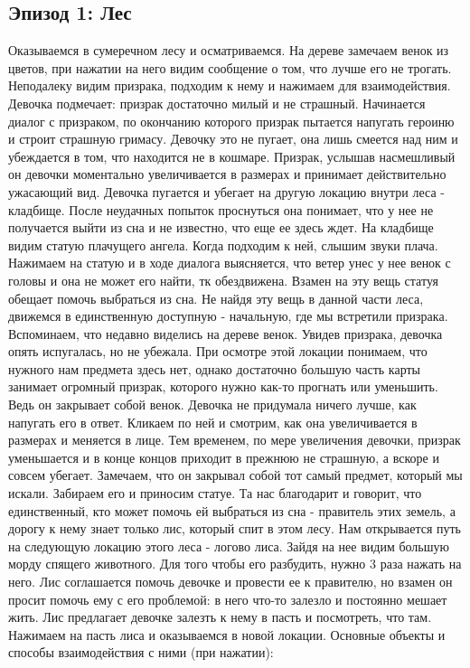 \subsection{Эпизод 1: Лес}

Оказываемся в сумеречном лесу и осматриваемся. На дереве замечаем венок из цветов, при нажатии на него видим сообщение о том, что лучше его не трогать. Неподалеку видим призрака, подходим к нему и нажимаем для взаимодействия. Девочка подмечает: призрак достаточно милый и не страшный. Начинается диалог с призраком, по окончанию которого призрак пытается напугать героиню и строит страшную гримасу. Девочку это не пугает, она лишь смеется над ним и убеждается в том, что находится не в кошмаре. Призрак, услышав насмешливый он девочки моментально увеличивается в размерах и принимает действительно ужасающий вид. Девочка пугается и убегает на другую локацию внутри леса - кладбище. После неудачных попыток проснуться она понимает, что у нее не получается выйти из сна и не известно, что еще ее здесь ждет. На кладбище видим статую плачущего ангела. Когда подходим к ней, слышим звуки плача. Нажимаем на статую и в ходе диалога выясняется, что ветер унес у нее венок с головы и она не может его найти, тк обездвижена. Взамен на эту вещь статуя обещает помочь выбраться из сна. Не найдя эту вещь в данной части леса, движемся в единственную доступную - начальную, где мы встретили призрака. Вспоминаем, что недавно виделись на дереве венок. Увидев призрака, девочка опять испугалась, но не убежала. При осмотре этой локации понимаем, что нужного нам предмета здесь нет, однако достаточно большую часть карты занимает огромный призрак, которого нужно как-то прогнать или уменьшить. Ведь он закрывает собой венок. Девочка не придумала ничего лучше, как напугать его в ответ. Кликаем по ней и смотрим, как она увеличивается в размерах и меняется в лице. Тем временем, по мере увеличения девочки, призрак уменьшается и в конце концов приходит в прежнюю не страшную, а вскоре и совсем убегает. Замечаем, что он закрывал собой тот самый предмет, который мы искали. Забираем его и приносим статуе. Та нас благодарит и говорит, что единственный, кто может помочь ей выбраться из сна - правитель этих земель, а дорогу к нему знает только лис, который спит в этом лесу. Нам открывается путь на следующую локацию этого леса - логово лиса. Зайдя на нее видим большую морду спящего животного. Для того чтобы его разбудить, нужно 3 раза нажать на него. Лис соглашается помочь девочке и провести ее к правителю, но взамен он просит помочь ему с его проблемой: в него что-то залезло и постоянно мешает жить. Лис предлагает девочке залезть к нему в пасть и посмотреть, что там. Нажимаем на пасть лиса и оказываемся в новой локации. Основные объекты и способы  взаимодействия с ними (при нажатии):
